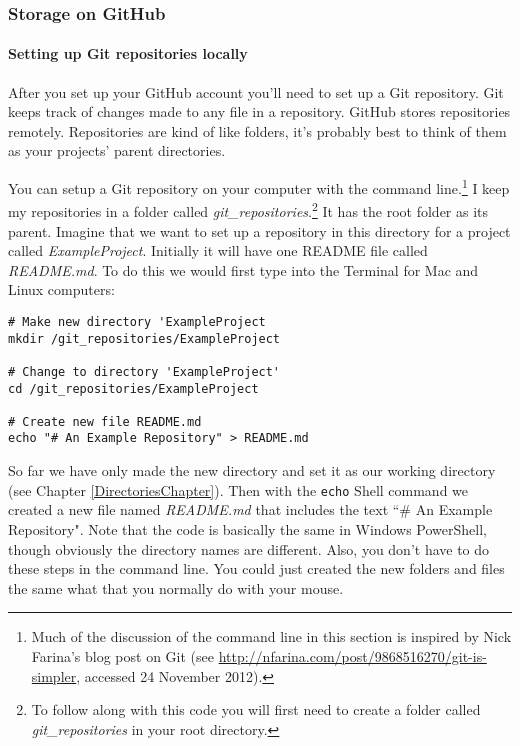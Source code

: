 \subsubsection{Storage on GitHub}

\paragraph{Setting up Git repositories locally}
After you set up your GitHub account you'll need to set up a Git repository. Git keeps track of changes made to any file in a repository. GitHub stores repositories remotely. Repositories are kind of like folders, it's probably best to think of them as your projects' parent directories.

You can setup a Git repository on your computer with the command line.\footnote{Much of the discussion of the command line in this section is inspired by Nick Farina's blog post on Git (see \url{http://nfarina.com/post/9868516270/git-is-simpler}, accessed 24 November 2012).} I keep my repositories in a folder called {\emph{git\_repositories}}.\footnote{To follow along with this code you will first need to create a folder called {\emph{git\_repositories}} in your root directory.} It has the root folder as its parent. Imagine that we want to set up a repository in this directory for a project called {\emph{ExampleProject}}. Initially it will have one README file called {\emph{README.md}}. To do this we would first type into the Terminal for Mac and Linux computers:

\begin{knitrout}
\color{fgcolor}\begin{kframe}
\begin{verbatim}
# Make new directory 'ExampleProject
mkdir /git_repositories/ExampleProject

# Change to directory 'ExampleProject'
cd /git_repositories/ExampleProject

# Create new file README.md
echo "# An Example Repository" > README.md
\end{verbatim}
\end{kframe}
\end{knitrout}


\noindent So far we have only made the new directory and set it as our working directory (see Chapter \ref{DirectoriesChapter}). Then with the \texttt{echo} Shell command we created a new file named {\emph{README.md}} that includes the text ``\# An Example Repository". Note that the code is basically the same in Windows PowerShell, though obviously the directory names are different. Also, you don't have to do these steps in the command line. You could just created the new folders and files the same what that you normally do with your mouse.


